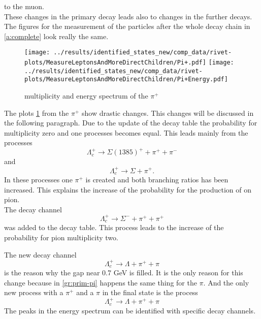 to the muon.\\
These changes in the primary decay leads also to changes in the further decays.
The figures for the measurement of the particles after the whole decay chain 
in {\ref{a:complete}} look really the same.
\begin{figure}[h]
  \centering
  \texttt{[image: ../results/identified\_states\_new/comp\_data/rivet-plots/MeasureLeptonsAndMoreDirectChildren/Pi+.pdf]}
  \texttt{[image: ../results/identified\_states\_new/comp\_data/rivet-plots/MeasureLeptonsAndMoreDirectChildren/Pi+Energy.pdf]}
  \caption{multiplicity and energy spectrum of the \(\pi^+\)} \label{gr:prim-pip}
\end{figure}
The plots {\ref{gr:prim-pip}} from the \(\pi^+\) show drastic changes. This 
changes will be discussed in the following paragraph. Due to the update of 
the decay table the probability for multiplicity zero and one processes
becomes equal. This leads mainly from the processes
\begin{equation}
  \Lambda_c^+ \rightarrow \Sigma(1385)^+ + \pi^+ + \pi^- \nonumber
\end{equation} and 
\begin{equation}
  \Lambda_c^+ \rightarrow \Sigma + \pi^+. \nonumber
\end{equation}
In these processes one \(\pi^+\) is created and both branching ratios has been increased. This explains the 
increase of the probability for the production of on pion.\\
The decay channel
\begin{equation}
  \Lambda_c^+ \rightarrow \Sigma^- + \pi^+ + \pi^+ \nonumber
\end{equation}
was added to the decay table. This process leads to the increase of the probability for 
pion multiplicity two.
\par
The new decay channel
\begin{equation}
  \Lambda_c^+ \rightarrow \Lambda + \pi^+ + \pi \nonumber
\end{equation}
is the reason why the gap near 0.7 GeV is filled. It is the only reason for this 
change because in {\ref{gr:prim-pi}} happens the same thing for the \(\pi\).
And the only new process with a \(\pi^+\) and a \(\pi\) in the final state 
is the process
\begin{equation}
  \Lambda_c^+ \rightarrow \Lambda + \pi^+ + \pi \nonumber
\end{equation}
The peaks in the energy spectrum can be identified with specific decay channels.
